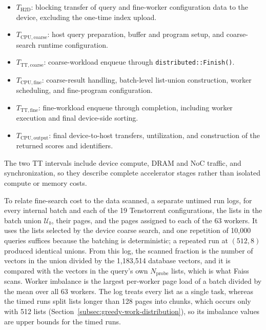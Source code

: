 \begin{itemize}
    \item \(T_{\mathrm{H2D}}\): blocking transfer of query and fine-worker
    configuration data to the device, excluding the one-time index upload.
    \item \(T_{\mathrm{CPU,coarse}}\): host query preparation, buffer and
    program setup, and coarse-search runtime configuration.
    \item \(T_{\mathrm{TT,coarse}}\): coarse-workload enqueue through
    \texttt{distributed::Finish()}.
    \item \(T_{\mathrm{CPU,fine}}\): coarse-result handling, batch-level
    list-union construction, worker scheduling, and fine-program configuration.
    \item \(T_{\mathrm{TT,fine}}\): fine-workload enqueue through completion,
    including worker execution and final device-side sorting.
    \item \(T_{\mathrm{CPU,output}}\): final device-to-host transfers,
    untilization, and construction of the returned scores and identifiers.
\end{itemize}

The two TT intervals include device compute, DRAM and NoC traffic, and
synchronization, so they describe complete accelerator stages rather than
isolated compute or memory costs.

To relate fine-search cost to the data scanned, a separate untimed run logs,
for every internal batch and each of the 19 Tenstorrent configurations, the
lists in the batch union \(\mathcal{U}_b\), their pages, and the pages assigned
to each of the 63 workers. It uses the lists selected by the device coarse
search, and one repetition of 10,000 queries suffices because the batching is
deterministic; a repeated run at \((512,8)\) produced identical unions. From
this log, the scanned fraction is the number of vectors in the union divided
by the 1,183,514 database vectors, and it is compared with the vectors in the
query's own \(N_{\mathrm{probe}}\) lists, which is what Faiss scans. Worker
imbalance is the largest per-worker page load of a batch divided by the mean
over all 63 workers. The log treats every list as a single task, whereas the
timed runs split lists longer than 128 pages into chunks, which occurs only
with 512 lists
(Section~\ref{subsec:greedy-work-distribution}), so its imbalance values are
upper bounds for the timed runs.

